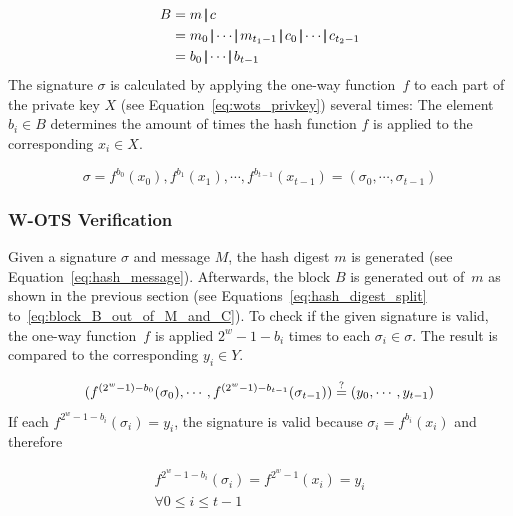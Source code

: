 \begin{align}
\label{eq:block_B_out_of_M_and_C}
B &= m \concat c  \\ 
&= m_0 \concat \cdots \concat m_{t_1 - 1} \concat c_0 \concat \cdots \concat c_{t_2 - 1} \nonumber \\
&= b_0 \concat \cdots \concat b_{t-1} \nonumber
\end{align}
The signature $\sigma$ is calculated by applying the one-way function~$f$ to each part of the private key $X$ (see Equation~\ref{eq:wots_privkey}) several times: The element $b_i \in B$ determines the amount of times the hash function $f$ is applied to the corresponding $x_i \in X$.

\begin{equation}
\sigma = f^{b_0}(x_0), f^{b_1}(x_1), \cdots, f^{b_{t-1}}(x_{t-1}) = (\sigma_0, \cdots, \sigma_{t-1})
\end{equation}

\subsubsection{W-OTS Verification}
Given a signature $\sigma$ and message $M$, the hash digest $m$ is generated (see Equation~\ref{eq:hash_message}). Afterwards, the block $B$ is generated out of~$m$ as shown in the previous section (see Equations~\ref{eq:hash_digest_split} to~\ref{eq:block_B_out_of_M_and_C}). To check if the given signature is valid, the one-way function~$f$ is applied $2^w - 1 - b_i$ times to each $\sigma_i \in \sigma$. The result is compared to the corresponding $y_i \in Y$.

\begin{equation}
(f^{(2^w-1)-b_0}(\sigma_0), \cdots, f^{(2^w - 1) - b_{t-1}}(\sigma_{t-1})) \stackrel{?}{=} (y_0, \cdots, y_{t-1})
\end{equation}
If each $f^{2^w-1-b_i}(\sigma_i) = y_i$, the signature is valid because $\sigma_i = f^{b_i}(x_i)$ and therefore

\begin{gather}
f^{2^w-1-b_i}(\sigma_i) = f^{2^w-1}(x_i) = y_i \\
\forall 0 \leq i \leq t-1 \nonumber
\end{gather}



